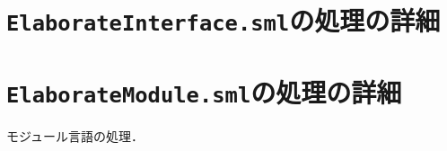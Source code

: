 \documentclass{jbook}
\newif\ifjp
\newcommand{\txt}[2]{#1}
\newcommand{\code}[1]{\mbox{\large\tt #1}}
\newcommand{\myem}{\mbox{\ \ }}
\newenvironment{program}{\begin{quote}\begin{tt}}%
                        {\end{tt}\end{quote}}
\begin{document}
\section{\txt{\code{ElaborateInterface.sml}の処理の詳細}{The details of \code{ElaborateInterface.sml}}}
\ifjp%
	インターフェイスの構文論的解釈処理．

\subsection{インターフェイスファイル\code{ElaborateInterface.smi}}
\begin{program}
structure ElaborateInterface =\\
\myem   struct\\
\myem\myem     type fixEnv = Fixity.fixity SEnv.map\\
\myem\myem     val elaborate\\
\myem\myem\myem   : AbsynInterface.interface -> fixEnv * PatternCalcInterface.interface\\
\myem\myem     val elaborateTopdecList\\
\myem\myem\myem   : AbsynInterface.itopdec list -> fixEnv * PatternCalcInterface.pitopdec list\\
\myem  end
\end{program}

\subsection{各関数の処理内容}
\begin{enumerate}
\item \code{elaborate}関数

	\code{Elaborator.elaborate}および
\code{Elaborator.elaborateInteractiveEnv}から呼び出され，インターフェイ
ス構文を処理．

\item \code{elaborateTopdecList}関数

\code{Elaborator.elaborateInteractiveEnv}から呼び出され，インターフェイス宣言文リストの処理を行う．

\end{enumerate}
\else%
\fi%

\section{\txt{\code{ElaborateModule.sml}の処理の詳細}{The details of \code{ElaborateModule.sml}}}
\ifjp%
	モジュール言語の処理．
\end{document}
